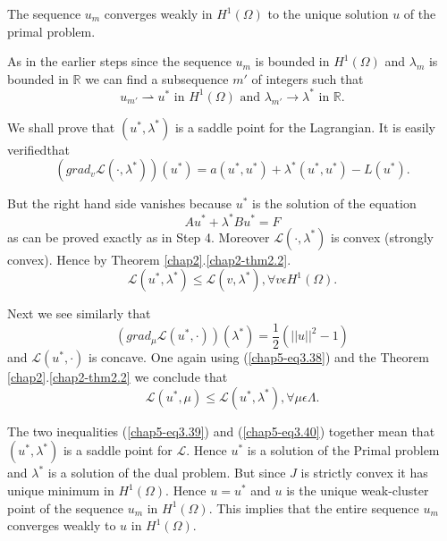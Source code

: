 \begin{step}\label{chap5-step5}
The sequence $u_{m}$ converges weakly in $H^{1}(\Omega)$ to the unique solution $u$ of the primal problem.

As in the earlier steps since the sequence $u_{m}$ is bounded in $H^{1}(\Omega)$ and $\lambda_{m}$ is bounded in $\mathbb{R}$ we can find a subsequence $m'$ of integers such that
$$
u_{m'} \rightharpoonup u^{*} \text{ in } H^{1}(\Omega) \text{ and } \lambda_{m'} \to \lambda^{*} \text{ in } \mathbb{R}.
$$

We shall prove that $(u^{*}, \lambda^{*})$ is a saddle point for the Lagrangian. It is easily verified\pageoriginale that
$$
(grad_{v} \mathscr{L} (\cdot , \lambda^{*})) (u^{*}) = a(u^{*}, u^{*}) + \lambda^{*} (u^{*}, u^{*}) - L(u^{*}).
$$

But the right hand side vanishes because $u^{*}$ is the solution of the equation 
$$
Au^{*} + \lambda^{*} Bu^{*} = F
$$
as can be proved exactly as in Step 4. Moreover $\mathscr{L}(\cdot, \lambda^{*})$ is convex (strongly convex). Hence by Theorem \ref{chap2}.\ref{chap2-thm2.2}.
\begin{equation*}
\mathscr{L} (u^{*}, \lambda^{*}) \leq \mathscr{L} (v, \lambda^{*}), \forall v \epsilon H^{1}(\Omega).\tag{3.39}\label{chap5-eq3.39}
\end{equation*}

Next we see similarly that
$$
(grad_{\mu} \mathscr{L}(u^{*}, \cdot))(\lambda^{*}) = \frac{1}{2} (||u||^{2} - 1)
$$
and $\mathscr{L}(u^{*}, \cdot)$ is concave. One again using (\ref{chap5-eq3.38}) and the Theorem \ref{chap2}.\ref{chap2-thm2.2} we conclude that
\begin{equation*}
\mathscr{L} (u^{*} , \mu) \leq \mathscr{L} (u^{*}, \lambda^{*}), \forall \mu \epsilon \Lambda.\tag{3.40}\label{chap5-eq3.40}
\end{equation*}

The two inequalities (\ref{chap5-eq3.39}) and (\ref{chap5-eq3.40}) together mean that $(u^{*}, \lambda^{*})$ is a saddle point for $\mathscr{L}$. Hence $u^{*}$ is a solution of the Primal problem and $\lambda^{*}$ is a solution of the dual problem. But since $J$ is strictly convex it has unique minimum in $H^{1}(\Omega)$. Hence $u = u^{*}$ and $u$ is the unique weak-cluster point of the sequence $u_{m}$ in $H^{1}(\Omega)$. This implies that the entire sequence $u_{m}$ converges weakly to $u$ in $H^{1}(\Omega)$.
\end{step}

